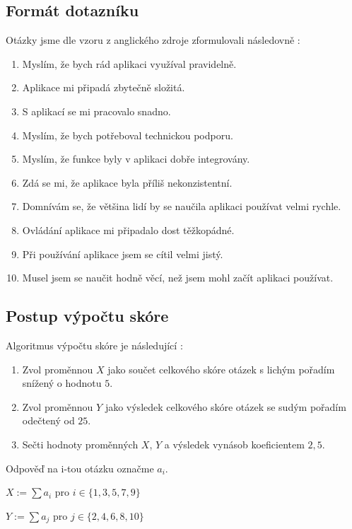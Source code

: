 \documentclass[12pt,a4paper]{report}
\begin{document}
\subsection{Formát dotazníku}
Otázky jsme dle vzoru z anglického zdroje zformulovali následovně \citep{sus-adobe}:

\begin{enumerate}
    \item Myslím, že bych rád aplikaci využíval pravidelně.
    \item Aplikace mi připadá zbytečně složitá.
    \item S aplikací se mi pracovalo snadno.
    \item Myslím, že bych potřeboval technickou podporu.
    \item Myslím, že funkce byly v aplikaci dobře integrovány.
    \item Zdá se mi, že aplikace byla příliš nekonzistentní.
    \item Domnívám se, že většina lidí by se naučila aplikaci používat velmi rychle.
    \item Ovládání aplikace mi připadalo dost těžkopádné.
    \item Při používání aplikace jsem se cítil velmi jistý.
    \item Musel jsem se naučit hodně věcí, než jsem mohl začít aplikaci používat.
\end{enumerate}

\subsection{Postup výpočtu skóre}

Algoritmus výpočtu skóre je následující \citep{sus-adobe}:

\begin{enumerate}
    \item Zvol proměnnou $X$ jako součet celkového skóre otázek s lichým pořadím snížený o hodnotu $5$.
    \item Zvol proměnnou $Y$ jako výsledek celkového skóre otázek se sudým pořadím odečtený od $25$.
    \item Sečti hodnoty proměnných $X$, $Y$ a výsledek vynásob koeficientem $2,5$.
\end{enumerate}

Odpověď na i-tou otázku označme $a_i$.

$X := \sum a_i$ pro $i \in \{1,3,5,7,9\}$

$Y := \sum a_j$ pro $j \in \{2,4,6,8,10\}$
\end{document}
